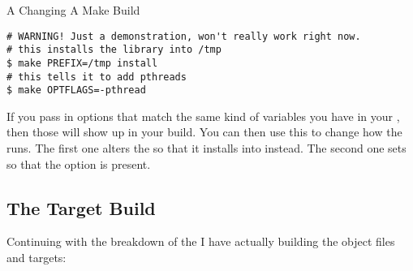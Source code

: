 \begin{code}{A Changing A Make Build}
\begin{Verbatim}
# WARNING! Just a demonstration, won't really work right now.
# this installs the library into /tmp
$ make PREFIX=/tmp install
# this tells it to add pthreads
$ make OPTFLAGS=-pthread
\end{Verbatim}
\end{code}

If you pass in options that match the same kind of variables you have in
your , then those will show up in your build.  You can then
use this to change how the  runs.  The first one alters the
 so that it installs into  instead.  The second
one sets  so that the  option is present.

\subsection{The Target Build}

Continuing with the breakdown of the  I have actually building
the object files and targets:

